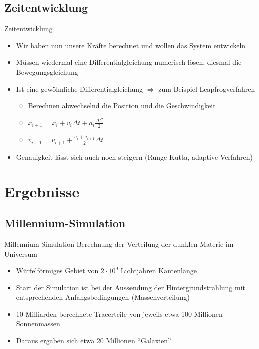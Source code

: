 \documentclass{beamer}
\begin{document}
\subsection*{Zeitentwicklung}
\begin{frame}{Zeitentwicklung}
  \begin{itemize}
    \item<+-> Wir haben nun unsere Kräfte berechnet und wollen das System entwickeln
    \item<+-> Müssen wiedermal eine Differentialgleichung numerisch lösen, diesmal
      die Bewegungsgleichung
    \item<+-> Ist eine gewöhnliche Differentialgleichung $\Rightarrow$ zum Beispiel
      Leapfrogverfahren
      \begin{itemize}
        \item<+-> Berechnen abwechselnd die Position und die Geschwindigkeit
        \item<+-> $x_{i+1} = x_i + v_{i}\Delta t + a_i\frac{\Delta t^2}{2}$
        \item<+-> $v_{i+1} = v_{i+1} + \frac{a_i + a_{i+1}}{2}\Delta t$
      \end{itemize}
    \item<+-> Genauigkeit lässt sich auch noch steigern (Runge-Kutta, adaptive
      Verfahren)
  \end{itemize}
\end{frame}

\section{Ergebnisse}
\subsection*{Millennium-Simulation}
\begin{frame}{Millennium-Simulation}
  Berechnung der Verteilung der dunklen Materie im Universum
  \begin{itemize}
    \item Würfelförmiges Gebiet von $2\cdot 10^9$ Lichtjahren Kantenlänge
    \item Start der Simulation ist bei der Aussendung der Hintergrundstrahlung
      mit entsprechenden Anfangsbedingungen (Massenverteilung)
    \item 10 Milliarden berechnete Tracerteile von jeweils etwa 100 Millionen
      Sonnenmassen
      \pause
    \item Daraus ergaben sich etwa 20 Millionen "`Galaxien"'\pause
  \end{itemize}
\end{frame}
\end{document}
